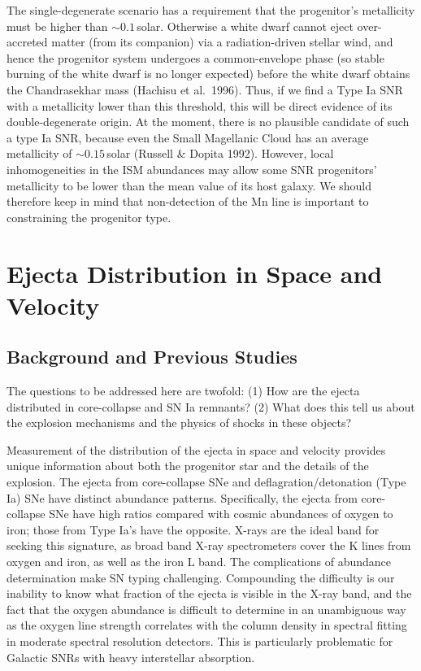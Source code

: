\documentclass[11pt,a4paper]{article}
\begin{document}
{The single-degenerate scenario has a requirement that the progenitor's
metallicity must be higher than $\sim 0.1$\,solar. Otherwise a white
dwarf cannot eject over-accreted matter (from its companion) via a
radiation-driven stellar wind, and hence the progenitor system
undergoes a common-envelope phase (so stable burning of the white
dwarf is no longer expected) before the white dwarf obtains the
Chandrasekhar mass (Hachisu et al.\ 1996). Thus, if we find a Type Ia
SNR with a metallicity lower than this threshold, this will be direct
evidence of its double-degenerate origin. At the moment, there is no
plausible candidate of such a type Ia SNR, because even the Small
Magellanic Cloud has an average metallicity of $\sim 0.15$\,solar
(Russell \& Dopita 1992). However, local inhomogeneities in the ISM
abundances may allow some SNR progenitors' metallicity to be lower
than the mean value of its host galaxy. We should therefore keep in
mind that non-detection of the Mn line is important to constraining
the progenitor type.




\section{Ejecta Distribution in Space and Velocity }

\subsection{Background and Previous Studies}

The questions to be addressed here are twofold: (1) How are the ejecta
distributed in core-collapse and SN Ia remnants?  (2) What does this
tell us about the explosion mechanisms and the physics of shocks in
these objects?

Measurement of the distribution of the ejecta in space and velocity
provides unique information about both the progenitor star and the
details of the explosion.  The ejecta from core-collapse SNe and
deflagration/detonation (Type Ia) SNe have distinct abundance
patterns. Specifically, the ejecta from core-collapse SNe have high
ratios compared with cosmic abundances of oxygen to iron; those from
Type Ia's have the opposite. X-rays are the ideal band for seeking
this signature, as broad band X-ray spectrometers cover the K lines
from oxygen and iron, as well as the iron L band. The complications of
abundance determination make SN typing challenging. Compounding the
difficulty is our inability to know what fraction of the ejecta is
visible in the X-ray band, and the fact that the oxygen abundance is
difficult to determine in an unambiguous way as the oxygen line
strength correlates with the column density in spectral fitting in
moderate spectral resolution detectors.  This is particularly
problematic for Galactic SNRs with heavy interstellar absorption.

}
\end{document}
